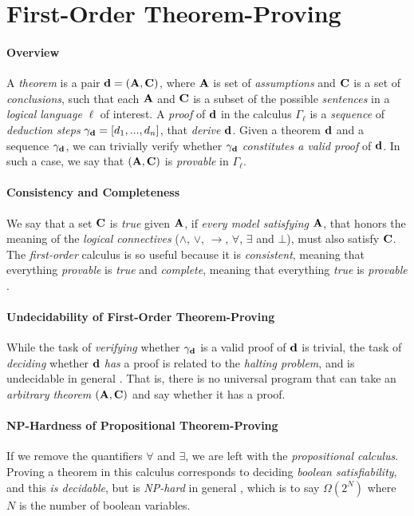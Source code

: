 \documentclass[11pt]{article}
\begin{document}
\section*{First-Order Theorem-Proving}
\paragraph{Overview}
A {\em theorem} is a pair ${\bf d} = \left( {\bf A}, {\bf C} \right)$, where ${\bf A}$ is set of {\em assumptions} and ${\bf C}$ is a set of {\em conclusions}, such that each ${\bf A}$ and ${\bf C}$ is a subset of the possible {\em sentences} in a {\em logical language} $\ell$ of interest.
A {\em proof} of ${\bf d}$ in the calculus $\Gamma_\ell$ is a {\em sequence} of {\em deduction steps} $\gamma_{\bf d} = [d_1, ..., d_n]$, that {\em derive} ${\bf d}$.
Given a theorem ${\bf d}$ and a sequence $\gamma_{\bf d}$, we can trivially verify whether $\gamma_{\bf d}$ {\em constitutes a valid proof} of ${\bf d}$.
In such a case, we say that $\left({\bf A}, {\bf C}\right)$ is {\em provable} in $\Gamma_\ell$.

\paragraph{Consistency and Completeness}
We say that a set ${\bf C}$ is {\em true} given ${\bf A}$, if {\em every model satisfying} ${\bf A}$, that honors the meaning of the {\em logical connectives} ($\land$, $\lor$, $\rightarrow$, $\forall$, $\exists$ and $\bot$), must also satisfy ${\bf C}$.
The {\em first-order} calculus is so useful because it is {\em consistent}, meaning that everything {\em provable} is {\em true} and {\em complete}, meaning that everything {\em true} is {\em provable} \cite{Godel1931, Gentzen1934}.

\paragraph{Undecidability of First-Order Theorem-Proving}
While the task of {\em verifying} whether $\gamma_{\bf d}$ is a valid proof of ${\bf d}$ is trivial, the task of {\em deciding} whether ${\bf d}$ {\em has} a proof is related to the {\em halting problem}, and is undecidable in general \cite{Turing1936, Church1936}.
That is, there is no universal program that can take an {\em arbitrary theorem} $\left( {\bf A}, {\bf C} \right)$ and say whether it has a proof.

\paragraph{NP-Hardness of Propositional Theorem-Proving}
If we remove the quantifiers $\forall$ and $\exists$, we are left with the {\em propositional calculus}.
Proving a theorem in this calculus corresponds to deciding {\em boolean satisfiability}, and this {\em is decidable}, but is {\em NP-hard} in general \cite{Cook1971}, which is to say $\Omega(2^N)$ where $N$ is the number of boolean variables.
\end{document}
